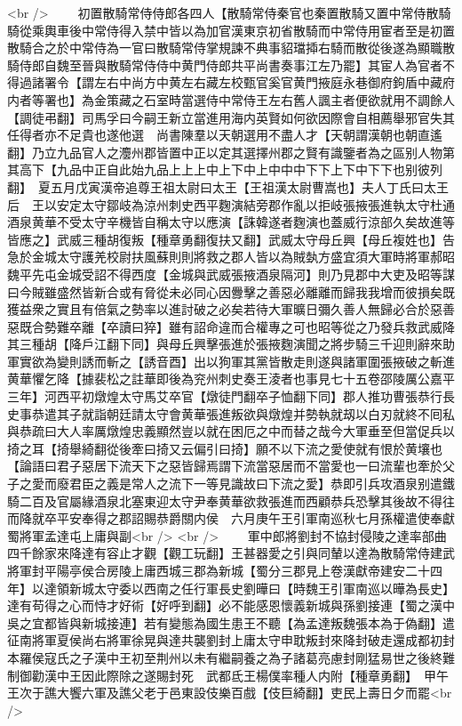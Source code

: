 <br />
　　初置散騎常侍侍郎各四人【散騎常侍秦官也秦置散騎又置中常侍散騎騎從乘輿車後中常侍得入禁中皆以為加官漢東京初省散騎而中常侍用宦者至是初置散騎合之於中常侍為一官曰散騎常侍掌規諫不典事貂璫揷右騎而散從後遂為顯職散騎侍郎自魏至晉與散騎常侍侍中黄門侍郎共平尚書奏事江左乃罷】其宦人為官者不得過諸署令【謂左右中尚方中黄左右藏左校甄官奚官黄門掖庭永巷御府鉤盾中藏府内者等署也】為金策藏之石室時當選侍中常侍王左右舊人諷主者便欲就用不調餘人【調徒弔翻】司馬孚曰今嗣王新立當進用海内英賢如何欲因際會自相薦舉邪官失其任得者亦不足貴也遂他選　尚書陳羣以天朝選用不盡人才【天朝謂漢朝也朝直遙翻】乃立九品官人之灋州郡皆置中正以定其選擇州郡之賢有識鑒者為之區别人物第其高下【九品中正自此始九品上上上中上下中上中中中下下上下中下下也别彼列翻】　夏五月戊寅漢帝追尊王祖太尉曰太王【王祖漢太尉曹嵩也】夫人丁氏曰太王后　王以安定太守鄒岐為涼州刺史西平麴演結旁郡作亂以拒岐張掖張進執太守杜通酒泉黄華不受太守辛機皆自稱太守以應演【誅韓遂者麴演也蓋威行涼部久矣故進等皆應之】武威三種胡復叛【種章勇翻復扶又翻】武威太守母丘興【母丘複姓也】告急於金城太守護羌校尉扶風蘇則則將救之郡人皆以為賊埶方盛宜須大軍時將軍郝昭魏平先屯金城受詔不得西度【金城與武威張掖酒泉隔河】則乃見郡中大吏及昭等謀曰今賊雖盛然皆新合或有脅從未必同心因釁擊之善惡必離離而歸我我增而彼損矣既獲益衆之實且有倍氣之勢率以進討破之必矣若待大軍曠日彌久善人無歸必合於惡善惡既合勢難卒離【卒讀曰猝】雖有詔命違而合權專之可也昭等從之乃發兵救武威降其三種胡【降戶江翻下同】與母丘興擊張進於張掖麴演聞之將步騎三千迎則辭來助軍實欲為變則誘而斬之【誘音酉】出以狗軍其黨皆散走則遂與諸軍圍張掖破之斬進黄華懼乞降【據裴松之註華即後為兖州刺史奏王淩者也事見七十五卷邵陵厲公嘉平三年】河西平初燉煌太守馬艾卒官【燉徒門翻卒子恤翻下同】郡人推功曹張恭行長史事恭遣其子就詣朝廷請太守會黄華張進叛欲與燉煌并勢執就刼以白刃就終不囘私與恭疏曰大人率厲燉煌忠義顯然豈以就在困厄之中而替之哉今大軍垂至但當促兵以掎之耳【掎舉綺翻從後牽曰掎又云偏引曰掎】願不以下流之愛使就有恨於黄壤也【論語曰君子惡居下流天下之惡皆歸焉謂下流當惡居而不當愛也一曰流輩也牽於父子之愛而廢君臣之義是常人之流下一等見識故曰下流之愛】恭即引兵攻酒泉别遣鐵騎二百及官屬緣酒泉北塞東迎太守尹奉黄華欲救張進而西顧恭兵恐擊其後故不得往而降就卒平安奉得之郡詔賜恭爵關内侯　六月庚午王引軍南巡秋七月孫權遣使奉獻　蜀將軍孟達屯上庸與副<br />
<br />
　　軍中郎將劉封不協封侵陵之達率部曲四千餘家來降達有容止才觀【觀工玩翻】王甚器愛之引與同輦以達為散騎常侍建武將軍封平陽亭侯合房陵上庸西城三郡為新城【蜀分三郡見上卷漢獻帝建安二十四年】以達領新城太守委以西南之任行軍長史劉曄曰【時魏王引軍南巡以曄為長史】達有苟得之心而恃才好術【好呼到翻】必不能感恩懷義新城與孫劉接連【蜀之漢中吳之宜都皆與新城接連】若有變態為國生患王不聽【為孟達叛魏張本為于偽翻】遣征南將軍夏侯尚右將軍徐晃與達共襲劉封上庸太守申耽叛封來降封破走還成都初封本羅侯寇氏之子漢中王初至荆州以未有繼嗣養之為子諸葛亮慮封剛猛易世之後終難制御勸漢中王因此際除之遂賜封死　武都氐王楊僕率種人内附【種章勇翻】　甲午王次于譙大饗六軍及譙父老于邑東設伎樂百戲【伎巨綺翻】吏民上壽日夕而罷<br />
